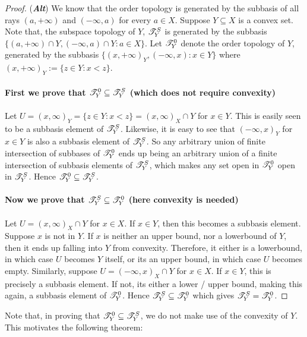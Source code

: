\documentclass[main.tex]{subfiles}
\begin{document}
\begin{proof} (\emph{\textbf{Alt}}) We know that the order topology is generated by the subbasis of all rays $(a,+\infty)$ and $(-\infty,a)$ for every $a \in X$. Suppose $Y \subseteq X$ is a convex set. Note that, the subspace topology of $Y$, $\mathscr T^S_Y$ is generated by the subbasis $\{(a,+\infty) \cap Y, (-\infty,a) \cap Y: a \in X\}$. Let $\mathscr T^0_Y$ denote the order topology of $Y$, generated by the subbasis $\{(x,+\infty)_Y, (-\infty,x): x \in Y\}$ where $(x,+\infty)_Y:=\{z \in Y: x<z\}$. 
\\\\ \textbf{First we prove that $\mathscr T^0_Y \subseteq \mathscr T^S_Y$ (which does not require convexity)}
\\\\ Let $U=(x,\infty)_Y=\{z \in Y: x<z\}=(x,\infty)_X \cap Y$ for $x \in Y$. This is easily seen to be a subbasis element of $\mathscr T^S_Y$. Likewise, it is easy to see that $(-\infty,x)_Y$ for $x \in Y$ is also a subbasis element of $\mathscr T^S_Y$. So any arbitrary union of finite intersection of subbases of $\mathscr T^0_Y$ ends up being an arbitrary union of a finite intersection of subbasis elements of $\mathscr T^S_Y$, which makes any set open in $\mathscr T^0_Y$ open in $\mathscr T^S_Y$. Hence $\mathscr T^0_Y \subseteq \mathscr T^S_Y$.
\\\\ \textbf{Now we prove that $\mathscr T^S_Y \subseteq \mathscr T^0_Y$ (here convexity is needed) }
\\\\ Let $U=(x,\infty)_X\cap Y$ for $x \in X$. If $x \in Y$, then this becomes a subbasis element. Suppose $x$ is not in $Y$. If $x$ is neither an upper bound, nor a lowerbound of $Y$, then it ends up falling into $Y$ from convexity. Therefore, it either is a lowerbound, in which case $U$ becomes $Y$ itself, or its an upper bound, in which case $U$ becomes empty. Similarly, suppose $U=(-\infty,x)_X \cap Y$ for $x \in X$. If $x \in Y$, this is precisely a subbasis element. If not, its either a lower / upper bound, making this again, a subbasis element of $\mathscr T^0_Y$. Hence $\mathscr T^S_Y \subseteq \mathscr T^0_Y$ which gives $\mathscr T^S_Y =\mathscr T^0_Y$.


\end{proof}
Note that, in proving that $\mathscr T^0_Y \subseteq \mathscr T^S_Y$, we do not make use of the convexity of $Y$. This motivates the following theorem:
\end{document}
